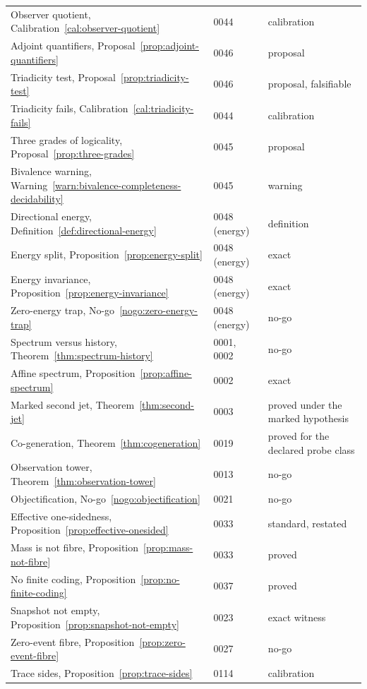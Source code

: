 \begin{longtable}{@{}p{}p{}p{}@{}}
Observer quotient, Calibration~\ref{cal:observer-quotient} & 0044 & calibration \\
Adjoint quantifiers, Proposal~\ref{prop:adjoint-quantifiers} & 0046 & proposal \\
Triadicity test, Proposal~\ref{prop:triadicity-test} & 0046 & proposal, falsifiable \\
Triadicity fails, Calibration~\ref{cal:triadicity-fails} & 0044 & calibration \\
Three grades of logicality, Proposal~\ref{prop:three-grades} & 0045 & proposal \\
Bivalence warning, Warning~\ref{warn:bivalence-completeness-decidability} & 0045 & warning \\
Directional energy, Definition~\ref{def:directional-energy} & 0048 (energy) & definition \\
Energy split, Proposition~\ref{prop:energy-split} & 0048 (energy) & exact \\
Energy invariance, Proposition~\ref{prop:energy-invariance} & 0048 (energy) & exact \\
Zero-energy trap, No-go~\ref{nogo:zero-energy-trap} & 0048 (energy) & no-go \\
Spectrum versus history, Theorem~\ref{thm:spectrum-history} & 0001, 0002 & no-go \\
Affine spectrum, Proposition~\ref{prop:affine-spectrum} & 0002 & exact \\
Marked second jet, Theorem~\ref{thm:second-jet} & 0003 & proved under the marked hypothesis \\
Co-generation, Theorem~\ref{thm:cogeneration} & 0019 & proved for the declared probe class \\
Observation tower, Theorem~\ref{thm:observation-tower} & 0013 & no-go \\
Objectification, No-go~\ref{nogo:objectification} & 0021 & no-go \\
Effective one-sidedness, Proposition~\ref{prop:effective-onesided} & 0033 & standard, restated \\
Mass is not fibre, Proposition~\ref{prop:mass-not-fibre} & 0033 & proved \\
No finite coding, Proposition~\ref{prop:no-finite-coding} & 0037 & proved \\
Snapshot not empty, Proposition~\ref{prop:snapshot-not-empty} & 0023 & exact witness \\
Zero-event fibre, Proposition~\ref{prop:zero-event-fibre} & 0027 & no-go \\
Trace sides, Proposition~\ref{prop:trace-sides} & 0114 & calibration \\

\end{longtable}
